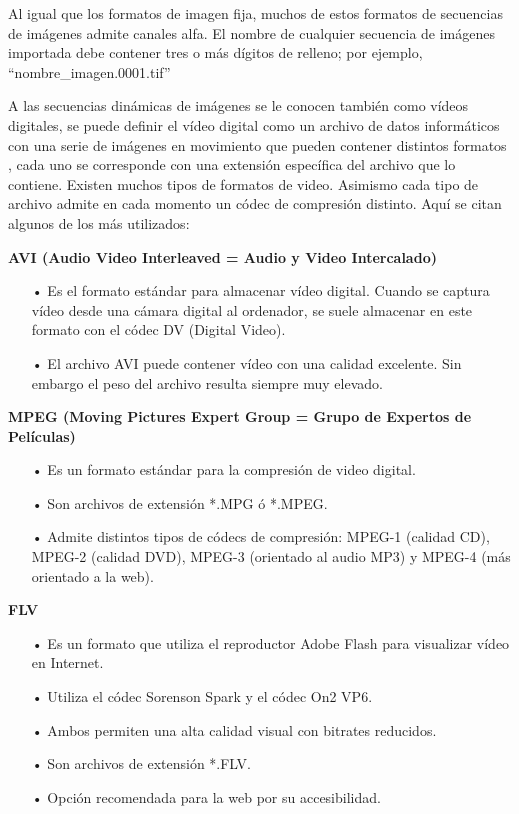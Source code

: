 Al igual que los formatos de imagen fija, muchos de estos formatos de secuencias de imágenes admite canales alfa. El nombre de cualquier secuencia de imágenes importada debe contener tres o más dígitos de relleno; por ejemplo, “nombre{\_}imagen.0001.tif”

A las secuencias dinámicas de imágenes se le conocen también como vídeos digitales, se puede definir el vídeo digital como un archivo de datos informáticos con una serie de imágenes en movimiento que pueden contener distintos formatos , cada uno se corresponde con una extensión específica del archivo que lo contiene. Existen muchos tipos de formatos de video. Asimismo cada tipo de archivo admite en cada momento un códec de compresión distinto. Aquí se citan algunos de los más utilizados: 

{\bf AVI (Audio Video Interleaved = Audio y Video Intercalado)} \vskip 0.1cm

\begin{itemize}
\item[•] Es el formato estándar para almacenar vídeo digital. Cuando se captura vídeo desde una cámara digital al ordenador, se suele almacenar en este formato con el códec DV (Digital Video).
\item[•] El archivo AVI puede contener vídeo con una calidad excelente. Sin embargo el peso del archivo resulta siempre muy elevado.
\end{itemize}

{\bf MPEG (Moving Pictures Expert Group = Grupo de Expertos de Películas)} \vskip 0.1cm

\begin{itemize}
\item[•] Es un formato estándar para la compresión de video digital.
\item[•] Son archivos de extensión *.MPG ó *.MPEG.
\item[•] Admite distintos tipos de códecs de compresión: MPEG-1 (calidad CD), MPEG-2 (calidad DVD), MPEG-3 (orientado al audio MP3) y MPEG-4 (más orientado a la web).
\end{itemize}

{\bf FLV} \vskip 0.1cm

\begin{itemize}
\item[•] Es un formato que utiliza el reproductor Adobe Flash para visualizar vídeo en Internet.
\item[•] Utiliza el códec Sorenson Spark y el códec On2 VP6.
\item[•] Ambos permiten una alta calidad visual con bitrates reducidos.
\item[•] Son archivos de extensión *.FLV.
\item[•] Opción recomendada para la web por su accesibilidad.
\end{itemize}

